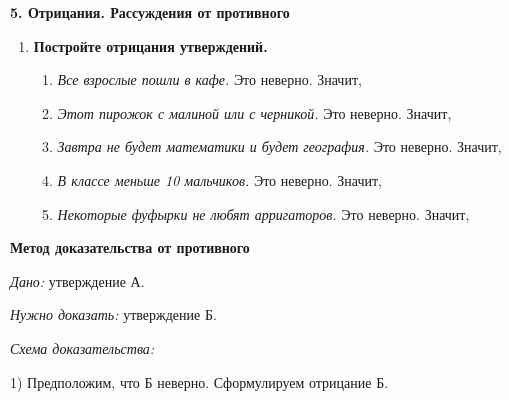 
\begin{center}
    \large\textbf{5. Отрицания. Рассуждения от противного}
\end{center}

\begin{enumerate}
    \item \textbf{Постройте отрицания утверждений.}


    \begin{enumerate}[label={},leftmargin=1.7em,itemsep=0.7em]
        \item[а)] \textit{Все взрослые пошли в кафе.} Это неверно. Значит, 

        \vspace{1.5cm}
        \item[б)] \textit{Этот пирожок с малиной или с черникой.} Это неверно. Значит, 

        \vspace{1.5cm}
        \item[в)] \textit{Завтра не будет математики и будет география.} Это неверно. Значит, 

        \vspace{1.5cm}


        \item[г)] \textit{В классе меньше 10 мальчиков.} Это неверно. Значит, 

        \vspace{1.5cm}


        \item[д)] \textit{Некоторые фуфырки не любят арригаторов.} Это неверно. Значит, 

        \vspace{1.5cm}
    \end{enumerate}
\end{enumerate}

\newpage

\begin{center}
\textbf{Метод доказательства от противного}
\end{center}

\textit{Дано:} утверждение А.

\textit{Нужно доказать:} утверждение Б.

\textit{Схема доказательства:}

1)  Предположим, что Б неверно. Сформулируем отрицание Б.

